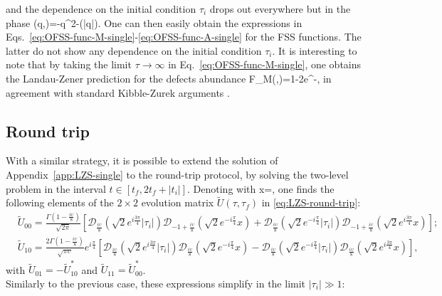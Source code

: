 and the dependence on the initial condition $\tau_i$ drops out everywhere but in the phase
\be\label{eq:phase}
\Phi(q,\upsilon)=-q^2-\log(|q|).
\ee
One can then easily obtain the expressions in Eqs.~\eqref{eq:OFSS-func-M-single}-\eqref{eq:OFSS-func-A-single} for the FSS functions. The latter do not show any dependence on the initial condition $\tau_i$. It is interesting to note that by taking the limit $\tau\to\infty$ in Eq.~\eqref{eq:OFSS-func-M-single}, one obtains the Landau-Zener prediction for the defects abundance
\be
{\cal F}_M(\tau\to\infty,\upsilon)=1-2e^{-},
\ee
in agreement with standard Kibble-Zurek arguments \cite{dziarmaga2010dynamics}.
\subsection{Round trip}
With a similar strategy, it is possible to extend the solution of Appendix~\ref{app:LZS-single} to the round-trip protocol, by solving the two-level problem in the interval $t\in[t_f, 2t_f+|t_i|]$. Denoting with
\be
x=,
\ee
one finds the following elements of the $2\times 2$ evolution matrix $\tilde{U}(\tau,\tau_f)$ in \eqref{eq:LZS-round-trip}:
\begin{subequations}
\begin{align}
&\tilde{U}_{00}=\frac{\Gamma(1-\frac{i\upsilon}{8})}{\sqrt{2\pi}}\left[\mathscr{D}_{\frac{i\upsilon}{8}}(\sqrt{2}e^{i\frac{3\pi}{4}}|\tau_i|)\mathscr{D}_{-1+\frac{i\upsilon}{8}}(\sqrt{2}e^{-i\frac{\pi}{4}}x) + \mathscr{D}_{\frac{i\upsilon}{8}}(\sqrt{2}e^{-i\frac{\pi}{4}}|\tau_i|) \mathscr{D}_{-1+\frac{i\upsilon}{8}}(\sqrt{2}e^{i\frac{3\pi}{4}}x)\right];\\[4pt]
&\tilde{U}_{10}=\frac{2\Gamma(1-\frac{i\upsilon}{8})}{\sqrt{\pi\upsilon}}e^{i\frac{\pi}{4}}\left[\mathscr{D}_{\frac{i\upsilon}{8}}(\sqrt{2}e^{i\frac{3\pi}{4}}|\tau_i|)\mathscr{D}_{\frac{i\upsilon}{8}}(\sqrt{2}e^{-i\frac{\pi}{4}}x) - \mathscr{D}_{\frac{i\upsilon}{8}}(\sqrt{2}e^{-i\frac{\pi}{4}}|\tau_i|) \mathscr{D}_{\frac{i\upsilon}{8}}(\sqrt{2}e^{i\frac{3\pi}{4}}x)\right],
\end{align}
\end{subequations}
with $\tilde{U}_{01}=-\tilde{U}_{10}^*$ and $\tilde{U}_{11}=\tilde{U}_{00}^*$. \\
Similarly to the previous case, these expressions simplify in the limit $|\tau_i|\gg 1$:
